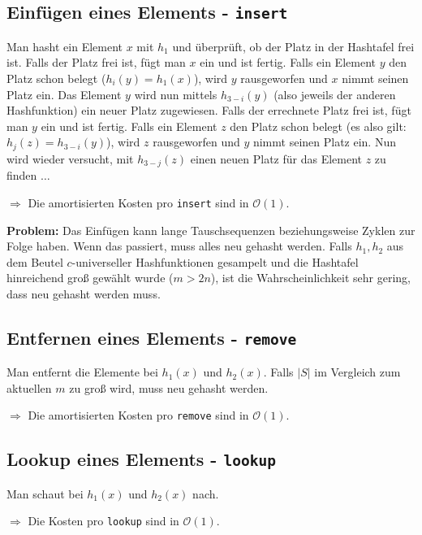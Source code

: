 \documentclass{scrartcl}%
\begin{document}
    \subsection*{Einfügen eines Elements - \texttt{insert}}
    Man hasht ein Element $x$  mit $h_1$ und überprüft, ob der Platz in der Hashtafel frei ist.
    Falls der Platz frei ist, fügt man $x$ ein und ist fertig.
    Falls ein Element $y$ den Platz schon belegt ($h_i(y) = h_1(x)$), wird $y$ rausgeworfen und $x$ nimmt seinen Platz ein.
    Das Element $y$ wird nun mittels $h_{3-i}(y)$ (also jeweils der anderen Hashfunktion) ein neuer Platz zugewiesen.
    Falls der errechnete Platz frei ist, fügt man $y$ ein und ist fertig.
    Falls ein Element $z$ den Platz schon belegt (es also gilt: $h_j(z) = h_{3-i}(y)$), wird $z$ rausgeworfen und $y$ nimmt seinen Platz ein.
    Nun wird wieder versucht, mit $h_{3-j}(z)$ einen neuen Platz für das Element $z$ zu finden $\ldots$

    $\Rightarrow$ Die amortisierten Kosten pro \texttt{insert} sind in $\mathcal{O}(1)$.

    \vspace*{0.3cm}
    \textbf{\textsf{Problem:}} Das Einfügen kann lange Tauschsequenzen beziehungsweise Zyklen zur Folge haben.
    Wenn das passiert, muss alles neu gehasht werden.
    Falls $h_1,h_2$ aus dem Beutel $c$-universeller Hashfunktionen gesampelt und die Hashtafel hinreichend groß
    gewählt wurde ($m > 2n$), ist die Wahrscheinlichkeit sehr gering, dass neu gehasht werden muss.

    \subsection*{Entfernen eines Elements - \texttt{remove}}
    Man entfernt die Elemente bei $h_1(x)$ und $h_2(x)$.
    Falls $|S|$ im Vergleich zum aktuellen $m$ zu groß wird, muss neu gehasht werden.

    $\Rightarrow$ Die amortisierten Kosten pro \texttt{remove} sind in $\mathcal{O}(1)$.

    \subsection*{Lookup eines Elements - \texttt{lookup}}
    Man schaut bei $h_1(x)$ und $h_2(x)$ nach.

    $\Rightarrow$ Die Kosten pro \texttt{lookup} sind in $\mathcal{O}(1)$.
\end{document}
